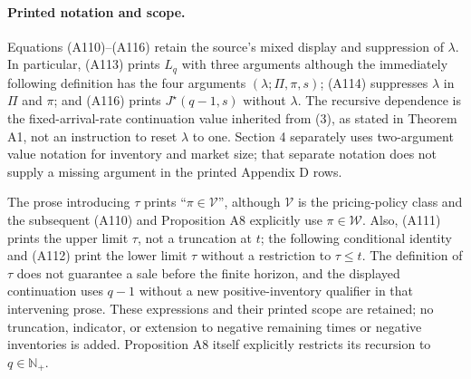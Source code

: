 \documentclass{article}
\begin{document}
\paragraph{Printed notation and scope.}
Equations (A110)--(A116) retain the source's mixed display and suppression of $\lambda$. In particular, (A113) prints $L_q$ with three arguments although the immediately following definition has the four arguments $(\lambda;\Pi,\pi,s)$; (A114) suppresses $\lambda$ in $\Pi$ and $\pi$; and (A116) prints $J^\star(q-1,s)$ without $\lambda$. The recursive dependence is the fixed-arrival-rate continuation value inherited from (3), as stated in Theorem A1, not an instruction to reset $\lambda$ to one. Section 4 separately uses two-argument value notation for inventory and market size; that separate notation does not supply a missing argument in the printed Appendix D rows.

The prose introducing $\tau$ prints ``$\pi\in\mathcal V$'', although $\mathcal V$ is the pricing-policy class and the subsequent (A110) and Proposition A8 explicitly use $\pi\in\mathcal W$. Also, (A111) prints the upper limit $\tau$, not a truncation at $t$; the following conditional identity and (A112) print the lower limit $\tau$ without a restriction to $\tau\leq t$. The definition of $\tau$ does not guarantee a sale before the finite horizon, and the displayed continuation uses $q-1$ without a new positive-inventory qualifier in that intervening prose. These expressions and their printed scope are retained; no truncation, indicator, or extension to negative remaining times or negative inventories is added. Proposition A8 itself explicitly restricts its recursion to $q\in\mathbb N_+$.
\end{document}
